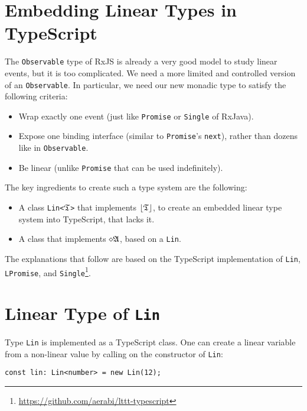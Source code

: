 \section{Embedding Linear Types in TypeScript}

The \texttt{Observable} type of RxJS is already a very good model to study linear events, but it is too complicated. We need a more limited and controlled version of an \texttt{Observable}. In particular, we need our new monadic type to satisfy the following criteria:
\begin{itemize}
    \item Wrap exactly one event (just like \texttt{Promise} or \texttt{Single} of RxJava).
    \item Expose one binding interface (similar to \texttt{Promise}'s \texttt{next}), rather than dozens like in \texttt{Observable}.
    \item Be linear (unlike \texttt{Promise} that can be used indefinitely).
\end{itemize}


The key ingredients to create such a type system are the following:
\begin{itemize}
    \item A class \texttt{Lin<}$\mathfrak{T}$\texttt{>} that implements $\left\lfloor \mathfrak{T} \right\rfloor$, to create an embedded linear type system into TypeScript, that lacks it.
    \item A class that implements $\diamond\mathfrak{A}$, based on a \texttt{Lin}.
\end{itemize}

The explanations that follow are based on the TypeScript implementation of \texttt{Lin}, \texttt{LPromise}, and \texttt{Single}\footnote{\url{https://github.com/aerabi/lttt-typescript}}.

\section{Linear Type of \texttt{Lin}}
Type \texttt{Lin} is implemented as a TypeScript class.
One can create a linear variable from a non-linear value by calling on the constructor of \texttt{Lin}:

\begin{verbatim}
const lin: Lin<number> = new Lin(12);
\end{verbatim}

